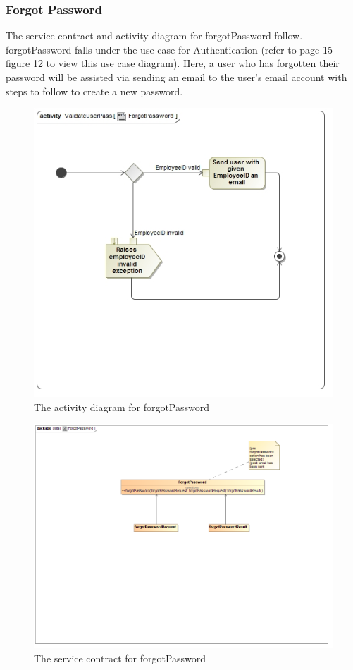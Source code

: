 \documentclass[a4paper,12pt]{article}
\begin{document}
\subsubsection{Forgot Password }
The service contract and activity diagram for forgotPassword follow. forgotPassword falls under the use case for Authentication (refer to page 15 - figure 12 to view this use case diagram). Here, a user who has forgotten their password will be assisted via sending an email to the user's email account with steps to follow to create a new password.
\begin{figure}[H]
  \centering
    \includegraphics[width=1.0\textwidth]{../images/ForgotPassword.jpg}
    \caption{The activity diagram for forgotPassword} 
\end{figure}
\begin{figure}[H]
  \centering
    \includegraphics[width=1.0\textwidth]{../images/ForgotPassword.png}
    \caption{The service contract for forgotPassword} 
\end{figure}
\end{document}
